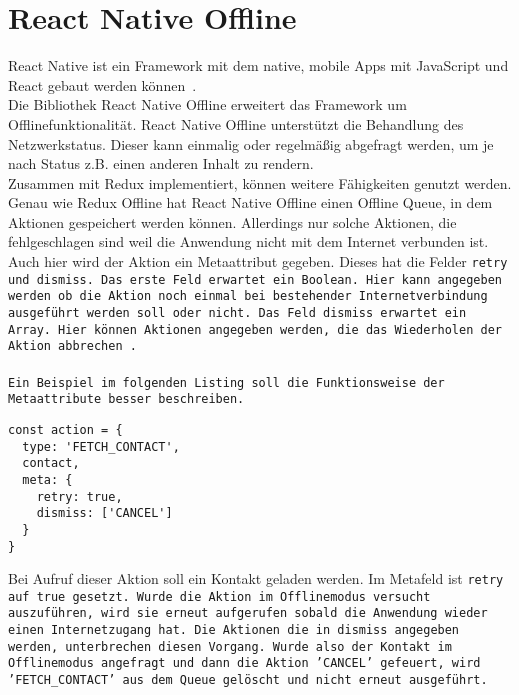 \section{React Native Offline}
React Native ist ein Framework mit dem native, mobile Apps mit JavaScript und React gebaut werden können~\cite{rn}.\\
Die Bibliothek React Native Offline erweitert das Framework um Offlinefunktionalität.
React Native Offline unterstützt die Behandlung des Netzwerkstatus.
Dieser kann einmalig oder regelmäßig abgefragt werden, um je nach Status z.B. einen anderen Inhalt zu rendern.\\
Zusammen mit Redux implementiert, können weitere Fähigkeiten genutzt werden.
Genau wie Redux Offline hat React Native Offline einen Offline \gls{Queue}, in dem Aktionen gespeichert werden können.
Allerdings nur solche Aktionen, die fehlgeschlagen sind weil die Anwendung nicht mit dem Internet verbunden ist.
Auch hier wird der Aktion ein Metaattribut gegeben. Dieses hat die Felder \tt{retry} und \tt{dismiss}.
Das erste Feld erwartet ein Boolean. Hier kann angegeben werden ob die Aktion noch einmal bei bestehender Internetverbindung ausgeführt werden soll oder nicht.
Das Feld \tt{dismiss} erwartet ein Array. Hier können Aktionen angegeben werden, die das Wiederholen der Aktion abbrechen~\cite{rn-offline-gh}.\\\\
Ein Beispiel im folgenden Listing soll die Funktionsweise der Metaattribute besser beschreiben.
%
\begin{lstlisting}
const action = {
  type: 'FETCH_CONTACT',
  contact,
  meta: {
    retry: true,
    dismiss: ['CANCEL']
  }
}
\end{lstlisting}
%
Bei Aufruf dieser Aktion soll ein Kontakt geladen werden.
Im Metafeld ist \tt{retry} auf \tt{true} gesetzt.
Wurde die Aktion im Offlinemodus versucht auszuführen, wird sie erneut aufgerufen sobald die Anwendung wieder einen Internetzugang hat.
Die Aktionen die in \tt{dismiss} angegeben werden, unterbrechen diesen Vorgang.
Wurde also der Kontakt im Offlinemodus angefragt und dann die Aktion 'CANCEL' gefeuert, wird 'FETCH\_CONTACT' aus dem Queue gelöscht und nicht erneut ausgeführt.
